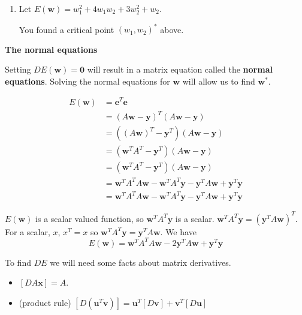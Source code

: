 \documentclass[12pt,letterpaper,noanswers]{exam}
\newcommand{\vc}[1]{\boldsymbol{#1}}
\begin{document}
\begin{enumerate}[resume=classQ]
\item Let $E(\vc{w}) = w_1^2+4w_1w_2+3w_2^2+w_2$.  
 
 You found a critical point $(w_1, w_2)^*$ above.  
 





\end{enumerate}

\noindent\textbf{The normal equations}
\begin{tcolorbox}
Setting $DE(\vc{w}) = \vc{0}$ will result in a matrix equation called the \textbf{normal equations}.  Solving the normal equations for $\vc{w}$ will allow us to find $\vc{w}^*$.
\end{tcolorbox}

\begin{align*}
        E(\vc{w}) &= \vc{e}^T\vc{e} \\
        &=(A\vc{w}-\vc{y})^T(A\vc{w}-\vc{y}) \\
        &=\left((A\vc{w})^T-\vc{y}^T\right)(A\vc{w}-\vc{y}) \\
        &=\left(\vc{w}^TA^T-\vc{y}^T\right)(A\vc{w}-\vc{y}) \\
        &=\left(\vc{w}^TA^T-\vc{y}^T\right)(A\vc{w}-\vc{y}) \\
        &=\vc{w}^TA^TA\vc{w}-\vc{w}^TA^T\vc{y}-\vc{y}^TA\vc{w} + \vc{y}^T\vc{y} \\
        &=\vc{w}^TA^TA\vc{w}-\vc{w}^TA^T\vc{y}-\vc{y}^TA\vc{w} + \vc{y}^T\vc{y}
    \end{align*}
    
\begin{tcolorbox}
    $E(\vc{w})$ is a scalar valued function, so $\vc{w}^TA^T\vc{y}$ is a scalar.  $\vc{w}^TA^T\vc{y}=(\vc{y}^TA\vc{w})^T$.  For a scalar, $x$, $x^T = x$ so $\vc{w}^TA^T\vc{y} = \vc{y}^TA\vc{w}$.  We have
    \[E(\vc{w}) = \vc{w}^TA^TA\vc{w}-2\vc{y}^TA\vc{w} + \vc{y}^T\vc{y}\]
    
To find $DE$ we will need some facts about matrix derivatives.
\begin{itemize}
\itemsep0pt
    \item $\left[D A\vc{x}\right] = A$.
    \item (product rule) $\left[D\left(\vc{u}^T\vc{v}\right)\right]= \vc{u}^T\left[D\vc{v}\right]+\vc{v}^T\left[D\vc{u}\right]$
\end{itemize}
\end{tcolorbox}
\end{document}
